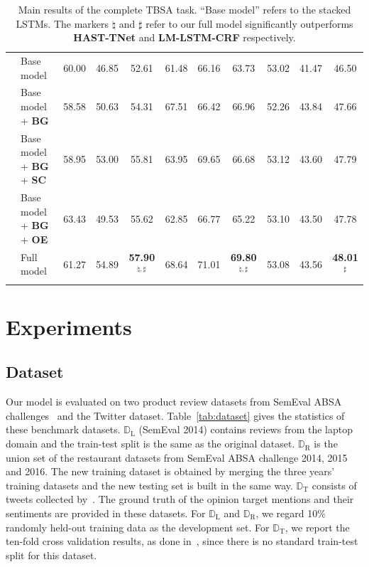\documentclass[letterpaper]{article} %
\begin{document}
\begin{table}[]
\begin{tabular}{ll|ccc|ccc|ccc}
        & Base model & 60.00 & 46.85 & 52.61 & 61.48 & 66.16 & 63.73 & 53.02 & 41.47 & 46.50 \\
        & Base model + \textbf{BG} & 58.58 & 50.63 & 54.31 & 67.51 & 66.42 & 66.96 & 52.26 & 43.84 & 47.66 \\
        & Base model + \textbf{BG} + \textbf{SC} & 58.95 & 53.00 & 55.81 & 63.95 & 69.65 & 66.68 & 53.12 & 43.60 & 47.79 \\
        & Base model + \textbf{BG} + \textbf{OE} & 63.43 & 49.53 & 55.62 & 62.85 & 66.77 & 65.22 & 53.10 & 43.50 & 47.78 \\
        & Full model & 61.27 & 54.89 & \textbf{57.90}$^{\natural,\sharp}$ & 68.64 & 71.01 & \textbf{69.80}$^{\natural,\sharp}$ & 53.08 & 43.56 & \textbf{48.01}$^{\sharp}$ \\
        \Xhline{3\arrayrulewidth}
    \end{tabular}
    \caption{Main results of the complete TBSA task. ``Base model'' refers to the stacked LSTMs. The markers $\natural$ and $\sharp$ refer to our full model significantly outperforms \textbf{HAST-TNet} and \textbf{LM-LSTM-CRF} respectively.}
    \label{tab:main_results}
\end{table}


\section{Experiments}
\subsection{Dataset}
Our model is evaluated on two product review datasets from SemEval ABSA challenges~\cite{S14-2004,S15-2082,S16-1002} and the Twitter dataset. Table~\ref{tab:dataset} gives the statistics of these benchmark datasets. $\mathbb{D}_{\mathrm{L}}$ (SemEval 2014) contains reviews from the laptop domain and the train-test split is the same as the original dataset. $\mathbb{D}_{\mathrm{R}}$ is the union set of the restaurant datasets from SemEval ABSA challenge 2014, 2015 and 2016. The new training dataset is obtained by merging the three years' training datasets and the new testing set is built in the same way. $\mathbb{D}_{\mathrm{T}}$ consists of tweets collected by~\cite{D13-1171}. The ground truth of the opinion target mentions and their sentiments are provided in these datasets. For $\mathbb{D}_{\mathrm{L}}$ and $\mathbb{D}_{\mathrm{R}}$, we regard 10\% randomly held-out training data as the development set. For $\mathbb{D}_{\mathrm{T}}$, we report the ten-fold cross validation results, as done in~\cite{D13-1171,D15-1073}, since there is no standard train-test split for this dataset. %
\end{document}
